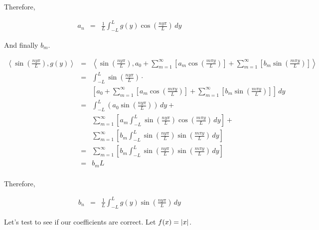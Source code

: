 \documentclass[10pt]{article}
\begin{document}
\begin{easylist}[enumerate]
    Therefore,

    \begin{align*}
        a_n &=& \frac{1}{L}\int_{-L}^L g(y) \cos \left( \frac{ny\pi}{L} \right) \, dy
    \end{align*}

    And finally $b_m$.

    \begin{align*}
        \left\langle \sin \left( \frac{ ny\pi }{L} \right) , g(y) \right\rangle &=& \left\langle \sin \left( \frac{ ny\pi }{L} \right),
            a_0 + \sum_{m=1}^\infty \left[ a_m \cos \left( \frac{m \pi y}{L} \right) \right] +
            \sum_{m=1}^\infty \left[ b_m \sin \left( \frac{m \pi y}{L} \right) \right] \right\rangle\\
        &=& \int_{-L}^L \sin \left( \frac{ ny\pi }{L} \right) \cdot\\
            &&\left[ a_0 + \sum_{m=1}^\infty \left[ a_m \cos \left( \frac{m \pi y}{L} \right) \right] +
            \sum_{m=1}^\infty \left[ b_m \sin \left( \frac{m \pi y}{L} \right) \right] \right] \, dy\\
        &=& \int_{-L}^L \left( a_0 \sin\left(\frac{ny\pi}{L}\right) \right) \, dy +\\
            &&\sum_{m=1}^\infty \left[ a_m \int_{-L}^L \sin\left(\frac{ny\pi}{L}\right) \cos \left( \frac{m \pi y}{L} \right) \, dy \right] +\\
            &&\sum_{m=1}^\infty \left[ b_m \int_{-L}^L \sin\left(\frac{ny\pi}{L}\right) \sin \left( \frac{m \pi y}{L} \right) \, dy \right]\\
        &=& \sum_{m=1}^\infty \left[ b_m \int_{-L}^L \sin\left(\frac{ny\pi}{L}\right) \sin \left( \frac{m \pi y}{L} \right) \, dy \right]\\
        &=& b_m L\\
    \end{align*}

    Therefore,

    \begin{align*}
        b_n &=& \frac{1}{L} \int_{-L}^L g(y) \sin \left( \frac{ny\pi}{L} \right) \, dy
    \end{align*}

    Let's test to see if our coefficients are correct. Let $f(x) = \left\lvert x \right\rvert$.

\hfill\begin{minipage}{\dimexpr\textwidth-1cm}


\end{minipage}
\end{easylist}
\end{document}
